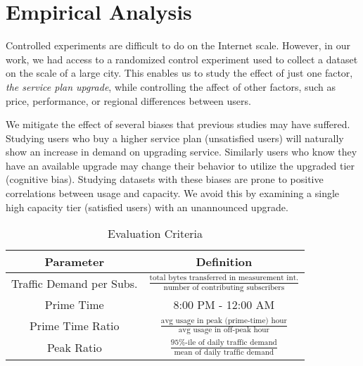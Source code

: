 \section{Empirical Analysis}\label{sec:analysis}


Controlled experiments are difficult to do on the Internet scale. However, in 
our work, we had access to a randomized control experiment used to collect a 
dataset on the scale of a large city. This enables us to study the effect of 
just one factor, \emph{the service plan upgrade}, while controlling the affect 
of other factors, such as price, performance, or regional differences between 
users.

We mitigate the effect of several biases that previous studies may have 
suffered. Studying users who buy a higher service plan (unsatisfied users) will 
naturally show an increase in demand on upgrading service. Similarly users who 
know they have an available upgrade may change their behavior to utilize the 
upgraded tier (cognitive bias). Studying datasets with these biases are prone 
to positive correlations between usage and capacity. We avoid this by examining 
a single high capacity tier (satisfied users) with an unannounced upgrade.

\begin{table}[t]
\begin{tabular}{| c | c |}\hline
\textbf{Parameter} & \textbf{Definition}	\\\hline
Traffic Demand per Subs.& \(\frac{\text{total bytes transferred in 
measurement int.}}{\text{number of contributing subscribers}}\)	\\
Prime Time		& 8:00 PM - 12:00 AM   		\\
Prime Time Ratio 	& \( \frac{ \text{avg usage in peak (prime-time) 
hour}}{ \text{avg usage in off-peak hour}}\) 		\\
Peak Ratio 		& \(\frac{\text{95\%-ile of daily traffic 
demand}}{\text{mean of daily traffic demand}}\)	\\\hline
\end{tabular}
\caption{Evaluation Criteria}
\label{tab:eval-criteria}
\end{table}


